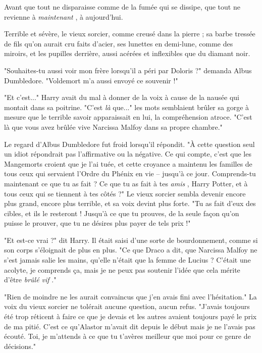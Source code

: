 Avant que tout ne disparaisse comme de la fumée qui se dissipe, que tout ne revienne à \emph{maintenant} , à aujourd'hui.

Terrible et sévère, le vieux sorcier, comme creusé dans la pierre ; sa barbe tressée de fils qu'on aurait cru faits d'acier, ses lunettes en demi-lune, comme des miroirs, et les pupilles derrière, aussi acérées et inflexibles que du diamant noir.

"Souhaites-tu aussi voir mon frère lorsqu'il a péri par Doloris ?" demanda Albus Dumbledore. "Voldemort m'a aussi envoyé ce souvenir !"

"Et c'est..." Harry avait du mal à donner de la voix à cause de la nausée qui montait dans sa poitrine. "C'est \emph{là}  que..." les mots semblaient brûler sa gorge à mesure que le terrible savoir apparaissait en lui, la compréhension atroce. "C'est là que vous avez brûlée vive Narcissa Malfoy dans sa propre chambre."

Le regard d'Albus Dumbledore fut froid lorsqu'il répondit. "À cette question seul un idiot répondrait pas l'affirmative ou la négative. Ce qui compte, c'est que les Mangemorts croient que je l'ai tuée, et cette croyance a maintenu les familles de tous ceux qui servaient l'Ordre du Phénix en vie – jusqu'à ce jour. Comprends-tu maintenant ce que tu as fait ? Ce que tu as fait à tes \emph{amis} , Harry Potter, et à tous ceux qui se tiennent à tes côtés ?" Le vieux sorcier sembla devenir encore plus grand, encore plus terrible, et sa voix devint plus forte. "Tu as fait d'eux des cibles, et ils le resteront ! Jusqu'à ce que tu prouves, de la seule façon qu'on puisse le prouver, que tu ne désires plus payer de tels prix !"

"Et est-ce vrai ?" dit Harry. Il était saisi d'une sorte de bourdonnement, comme si son corps s'éloignait de plus en plus. "Ce que Draco a dit, que Narcissa Malfoy ne s'est jamais salie les mains, qu'elle n'était que la femme de Lucius ? C'était une acolyte, je comprends ça, mais je ne peux pas soutenir l'idée que cela mérite d'être \emph{brûlé vif} ."

"Rien de moindre ne les aurait convaincus que j'en avais fini avec l'hésitation." La voix du vieux sorcier ne tolérait aucune question, aucun refus. "J'avais toujours été trop réticent à faire ce que je devais et les autres avaient toujours payé le prix de ma pitié. C'est ce qu'Alastor m'avait dit depuis le début mais je ne l'avais pas écouté. Toi, je m'attends à ce que tu t'avères meilleur que moi pour ce genre de décisions."

